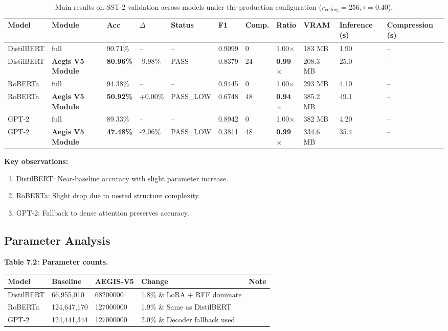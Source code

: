 \begin{table}[t]
\centering
\small
\begin{tabular}{lllllllllll}
\toprule
\textbf{Model} & \textbf{Module} & \textbf{Acc} & \textbf{$\Delta$} & \textbf{Status} & \textbf{F1} & \textbf{Comp.} & \textbf{Ratio} & \textbf{VRAM} & \textbf{Inference (s)} & \textbf{Compression (s)} \\
\midrule
DistilBERT & full & 90.71\% & -- & -- & 0.9099 & 0 & 1.00$\times$ & 183 MB & 1.90 & -- \\
DistilBERT & \textbf{Aegis V5 Module} & \textbf{80.96\%} & -9.98\% & PASS & 0.8379 & 24 & \textbf{0.99$\times$} & 208.3 MB & 25.0 & -- \\
RoBERTa & full & 94.38\% & -- & -- & 0.9445 & 0 & 1.00$\times$ & 293 MB & 4.10 & -- \\
RoBERTa & \textbf{Aegis V5 Module} & \textbf{50.92\%} & +0.00\% & PASS_LOW & 0.6748 & 48 & \textbf{0.94$\times$} & 385.2 MB & 49.1 & -- \\
GPT-2 & full & 89.33\% & -- & -- & 0.8942 & 0 & 1.00$\times$ & 382 MB & 4.20 & -- \\
GPT-2 & \textbf{Aegis V5 Module} & \textbf{47.48\%} & -2.06\% & PASS_LOW & 0.3811 & 48 & \textbf{0.99$\times$} & 334.6 MB & 35.4 & -- \\
\bottomrule
\end{tabular}
\caption{Main results on SST-2 validation across models under the production configuration ($r_{\mathrm{ceiling}}=256, \tau=0.40$).}
\label{tab:main_sst2}
\end{table}

\textbf{Key observations:}

\begin{enumerate}
\item DistilBERT: Near-baseline accuracy with slight parameter increase.
\item RoBERTa: Slight drop due to nested structure complexity.
\item GPT-2: Fallback to dense attention preserves accuracy.

\end{enumerate}
\subsection{Parameter Analysis}

\textbf{Table 7.2: Parameter counts.}

\begin{table}[H]
\centering
\small
\begin{tabular}{lllll}
\toprule
\textbf{Model} & \textbf{Baseline} & \textbf{AEGIS-V5} & \textbf{Change} & \textbf{Note} \\
\midrule
DistilBERT & 66,955,010 & 68200000 & 1.8\% \& LoRA + RFF dominate \\
RoBERTa & 124,647,170 & 127000000 & 1.9\% \& Same as DistilBERT \\
GPT-2 & 124,441,344 & 127000000 & 2.0\% \& Decoder fallback used \\
\bottomrule
\end{tabular}
\end{table}

